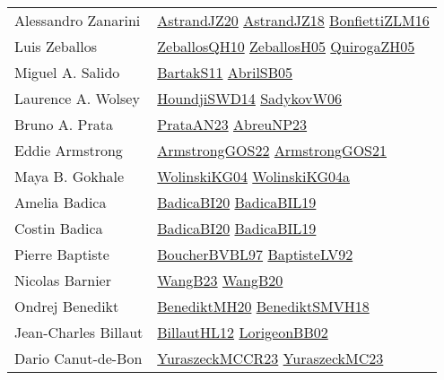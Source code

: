 {\begin{longtable}{p{4cm}p{20cm}}
Alessandro Zanarini & \href{articles/AstrandJZ20.pdf}{AstrandJZ20}\cite{AstrandJZ20} \href{papers/AstrandJZ18.pdf}{AstrandJZ18}\cite{AstrandJZ18} \href{papers/BonfiettiZLM16.pdf}{BonfiettiZLM16}\cite{BonfiettiZLM16} \\
Luis Zeballos & \href{articles/ZeballosQH10.pdf}{ZeballosQH10}\cite{ZeballosQH10} \href{articles/ZeballosH05.pdf}{ZeballosH05}\cite{ZeballosH05} \href{papers/QuirogaZH05.pdf}{QuirogaZH05}\cite{QuirogaZH05} \\
Miguel A. Salido & \href{articles/BartakS11.pdf}{BartakS11}\cite{BartakS11} \href{papers/AbrilSB05.pdf}{AbrilSB05}\cite{AbrilSB05} \\
Laurence A. Wolsey & \href{papers/HoundjiSWD14.pdf}{HoundjiSWD14}\cite{HoundjiSWD14} \href{articles/SadykovW06.pdf}{SadykovW06}\cite{SadykovW06} \\
Bruno A. Prata & \href{articles/PrataAN23.pdf}{PrataAN23}\cite{PrataAN23} \href{articles/AbreuNP23.pdf}{AbreuNP23}\cite{AbreuNP23} \\
Eddie Armstrong & \href{papers/ArmstrongGOS22.pdf}{ArmstrongGOS22}\cite{ArmstrongGOS22} \href{papers/ArmstrongGOS21.pdf}{ArmstrongGOS21}\cite{ArmstrongGOS21} \\
Maya B. Gokhale & \href{papers/WolinskiKG04.pdf}{WolinskiKG04}\cite{WolinskiKG04} \href{papers/WolinskiKG04a.pdf}{WolinskiKG04a}\cite{WolinskiKG04a} \\
Amelia Badica & \href{articles/BadicaBI20.pdf}{BadicaBI20}\cite{BadicaBI20} \href{papers/BadicaBIL19.pdf}{BadicaBIL19}\cite{BadicaBIL19} \\
Costin Badica & \href{articles/BadicaBI20.pdf}{BadicaBI20}\cite{BadicaBI20} \href{papers/BadicaBIL19.pdf}{BadicaBIL19}\cite{BadicaBIL19} \\
Pierre Baptiste & \href{papers/BoucherBVBL97.pdf}{BoucherBVBL97}\cite{BoucherBVBL97} \href{papers/BaptisteLV92.pdf}{BaptisteLV92}\cite{BaptisteLV92} \\
Nicolas Barnier & \href{papers/WangB23.pdf}{WangB23}\cite{WangB23} \href{papers/WangB20.pdf}{WangB20}\cite{WangB20} \\
Ondrej Benedikt & \href{articles/BenediktMH20.pdf}{BenediktMH20}\cite{BenediktMH20} \href{papers/BenediktSMVH18.pdf}{BenediktSMVH18}\cite{BenediktSMVH18} \\
Jean{-}Charles Billaut & \href{papers/BillautHL12.pdf}{BillautHL12}\cite{BillautHL12} \href{articles/LorigeonBB02.pdf}{LorigeonBB02}\cite{LorigeonBB02} \\
Dario Canut{-}de{-}Bon & \href{articles/YuraszeckMCCR23.pdf}{YuraszeckMCCR23}\cite{YuraszeckMCCR23} \href{papers/YuraszeckMC23.pdf}{YuraszeckMC23}\cite{YuraszeckMC23} \\

\end{longtable}}
